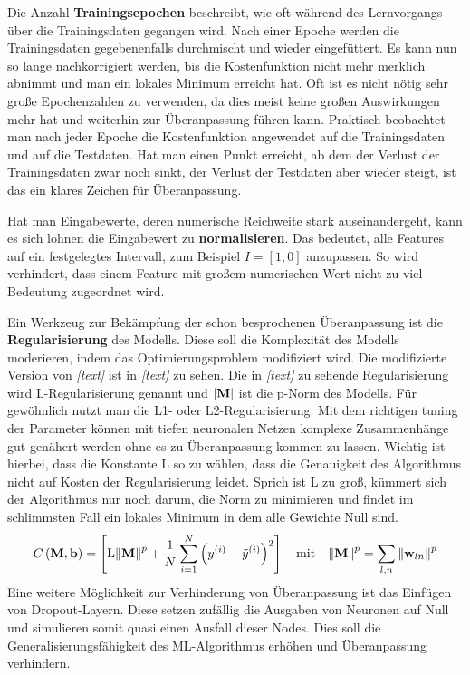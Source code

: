 Die Anzahl \textbf{Trainingsepochen} beschreibt, wie oft während des Lernvorgangs über die Trainingsdaten gegangen wird. Nach einer Epoche werden die Trainingsdaten gegebenenfalls durchmischt und wieder eingefüttert. Es kann nun so lange nachkorrigiert werden, bis die Kostenfunktion nicht mehr merklich abnimmt und man ein lokales Minimum erreicht hat. Oft ist es nicht nötig sehr große Epochenzahlen zu verwenden, da dies meist keine großen Auswirkungen mehr hat und weiterhin zur Überanpassung führen kann. Praktisch beobachtet man nach jeder Epoche die Kostenfunktion angewendet auf die Trainingsdaten und auf die Testdaten. Hat man einen Punkt erreicht, ab dem der Verlust der Trainingsdaten zwar noch sinkt, der Verlust der Testdaten aber wieder steigt, ist das ein klares Zeichen für Überanpassung. 

Hat man Eingabewerte, deren numerische Reichweite stark auseinandergeht, kann es sich lohnen die Eingabewert zu \textbf{normalisieren}. Das bedeutet, alle Features auf ein festgelegtes Intervall, zum Beispiel $I=[1,0]$ anzupassen. So wird verhindert, dass einem Feature mit großem numerischen Wert nicht zu viel Bedeutung zugeordnet wird.

Ein Werkzeug zur Bekämpfung der schon besprochenen Überanpassung ist die \textbf{Regularisierung} des Modells. Diese soll die Komplexität des Modells moderieren, indem das Optimierungsproblem modifiziert wird. Die modifizierte Version von \textit{\autoref{text}} ist in \textit{\autoref{text}} zu sehen. Die in \textit{\autoref{text}} zu sehende Regularisierung wird L-Regularisierung genannt und $\abs{\mathbf{M}}$ ist die p-Norm des Modells. Für gewöhnlich nutzt man die L1- oder L2-Regularisierung. Mit dem richtigen tuning der Parameter können mit tiefen neuronalen Netzen komplexe Zusammenhänge gut genähert werden ohne es zu Überanpassung kommen zu lassen. Wichtig ist hierbei, dass die Konstante $\text{L}$ so zu wählen, dass die Genauigkeit des Algorithmus nicht auf Kosten der Regularisierung leidet. Sprich ist L zu groß, kümmert sich der Algorithmus nur noch darum, die Norm zu minimieren und findet im schlimmsten Fall ein lokales Minimum in dem alle Gewichte Null sind. 
\begin{equation}
	C\left(\mathbf{M}, \mathbf{b}\right) = \left[ \text{L}\norm{\mathbf{M}}^p + \frac{1}{N}\sum_{i=1}^{N}\left(y^{(i)} - \tilde{y}^{(i)}\right)^2\right] \quad \text{mit} \quad \norm{\mathbf{M}}^p= \sum_{l,n} \norm{\mathbf{w}_{ln}}^p
\end{equation}
Eine weitere Möglichkeit zur Verhinderung von Überanpassung ist das Einfügen von Dropout-Layern. Diese setzen zufällig die Ausgaben von Neuronen auf Null und simulieren somit quasi einen Ausfall dieser Nodes. Dies soll die Generalisierungsfähigkeit des ML-Algorithmus erhöhen und Überanpassung verhindern.

